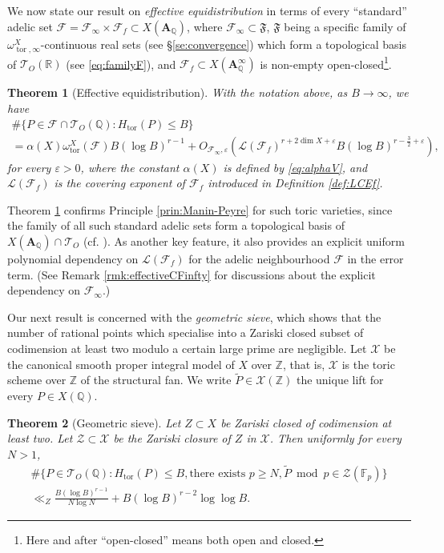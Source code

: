 \documentclass[11pt,letterpaper]{amsart}
\newcommand{\BF}{{\mathbb {F}}}
\newcommand{\BQ}{{\mathbb {Q}}}
\newcommand{\BR}{{\mathbb {R}}}
\newcommand{\BZ}{{\mathbb {Z}}}
\newcommand{\CF}{{\mathcal {F}}}
\newcommand{\CL}{{\mathcal {L}}}
\newcommand{\CT}{{\mathcal {T}}}
\newcommand{\CX}{{\mathcal {X}}}
\newcommand{\CZ}{{\mathcal {Z}}}
\newcommand{\RA}{{\mathbf {A}}}
\theoremstyle{plain}
\numberwithin{equation}{section}
\newtheorem{theorem}{Theorem}[section]
\theoremstyle{definition}
\theoremstyle{remark}
\begin{document}
We now state our result on  \emph{effective equidistribution}  in terms of every ``standard'' adelic set $\CF=\CF_\infty\times\CF_{f}\subset X(\RA_\BQ)$, where $\CF_\infty\subset \mathfrak{F}$, $\mathfrak{F}$ being a specific family of $\omega_{\operatorname{tor},\infty}^X$-continuous real sets (see \S\ref{se:convergence}) which form a topological basis of $\CT_{O}(\BR)$ (see \eqref{eq:familyF}), and $\CF_{f}\subset X(\RA_\BQ^\infty)$ is non-empty open-closed\footnote{Here and after ``open-closed'' means both open and closed.}.


\begin{theorem}[Effective equidistribution]\label{thm:mainequidist}
	With the notation above, as $B\to\infty$, we have 
	\begin{multline*}
		\#\{P\in \CF\cap \CT_{O}(\BQ):H_{\operatorname{tor}}(P)\leqslant B\}\\=\alpha(X)\omega_{\operatorname{tor}}^X (\CF)B(\log B)^{r-1}+O_{\CF_\infty,\varepsilon}\left(\CL(\CF_f)^{r+2\dim X+\varepsilon}B(\log B)^{r-\frac{3}{2}+\varepsilon}\right), 
	\end{multline*}
	 for every $\varepsilon>0$, where the constant $\alpha(X)$ is defined by \eqref{eq:alphaV}, and $\CL(\CF_f)$ is the covering exponent of $\CF_{f}$ introduced in Definition \ref{def:LCEf}.
\end{theorem}

Theorem \ref{thm:mainequidist} confirms Principle \ref{prin:Manin-Peyre} for such toric varieties, since the family of all such standard adelic sets form a topological basis of $X(\RA_\BQ)\cap \CT_{O}$ (cf. \cite[Proposition 3.3]{Peyre}). As another key feature, it also provides an explicit uniform polynomial dependency on $\CL(\CF_{f})$ for the adelic neighbourhood $\CF$ in the error term.  
(See Remark \ref{rmk:effectiveCFinfty} for discussions about the explicit dependency on $\CF_\infty$.)

Our next result is concerned with the \emph{geometric sieve}, which shows that the number of rational points which specialise into a Zariski closed subset of codimension at least two modulo a certain large prime are negligible. Let $\CX$ be the canonical smooth proper integral model  of $X$ over $\BZ$, that is, $\CX$ is the toric scheme over $\BZ$ of the structural fan. We write $\widetilde{P}\in\CX(\BZ)$ the unique lift for every $P\in X(\BQ)$.

\begin{theorem}[Geometric sieve]\label{thm:maingeomsieve}
	Let $Z\subset X$ be Zariski closed of codimension at least two.
	Let $\CZ\subset \CX$ be the Zariski closure of $Z$ in $\CX$. Then uniformly for every $N>1$,
	\begin{multline*}
		\#\{P\in \CT_{O}(\BQ):H_{\operatorname{tor}}(P)\leqslant B, \text{there exists } p\geqslant N,\widetilde{P}~\operatorname{mod}~ p \in\CZ(\BF_p)\}\\\ll_Z \frac{B(\log B)^{r-1}}{N\log N}+B(\log B)^{r-2}\log\log B.
	\end{multline*}
\end{theorem}
\end{document}
